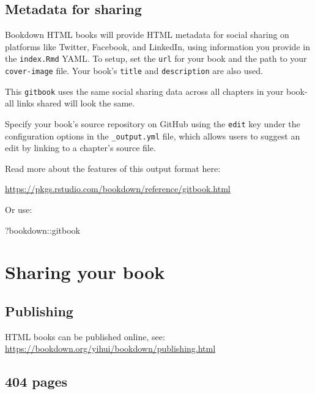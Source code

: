 \documentclass[
]{book}
\newenvironment{Shaded}{\begin{snugshade}}{\end{snugshade}}
\newcommand{\NormalTok}[1]{#1}
\newcommand{\SpecialCharTok}[1]{\textcolor[rgb]{0.00,0.00,0.00}{#1}}
\theoremstyle{definition}
\theoremstyle{definition}
\theoremstyle{definition}
\theoremstyle{definition}
\theoremstyle{remark}
\begin{document}
\hypertarget{metadata-for-sharing}{%
\section{Metadata for sharing}\label{metadata-for-sharing}}

Bookdown HTML books will provide HTML metadata for social sharing on platforms like Twitter, Facebook, and LinkedIn, using information you provide in the \texttt{index.Rmd} YAML. To setup, set the \texttt{url} for your book and the path to your \texttt{cover-image} file. Your book's \texttt{title} and \texttt{description} are also used.

This \texttt{gitbook} uses the same social sharing data across all chapters in your book- all links shared will look the same.

Specify your book's source repository on GitHub using the \texttt{edit} key under the configuration options in the \texttt{\_output.yml} file, which allows users to suggest an edit by linking to a chapter's source file.

Read more about the features of this output format here:

\url{https://pkgs.rstudio.com/bookdown/reference/gitbook.html}

Or use:

\begin{Shaded}
\begin{Highlighting}[]
\NormalTok{?bookdown}\SpecialCharTok{::}\NormalTok{gitbook}
\end{Highlighting}
\end{Shaded}

\hypertarget{sharing-your-book-1}{%
\chapter{Sharing your book}\label{sharing-your-book-1}}

\hypertarget{publishing-1}{%
\section{Publishing}\label{publishing-1}}

HTML books can be published online, see: \url{https://bookdown.org/yihui/bookdown/publishing.html}

\hypertarget{pages-1}{%
\section{404 pages}\label{pages-1}}
\end{document}
